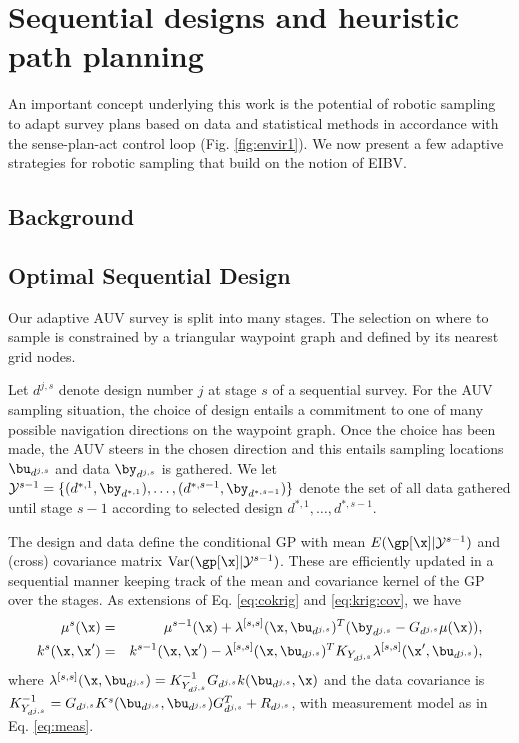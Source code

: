 \section{Sequential designs and heuristic path planning}\label{sec:heuristics}

An important concept underlying this work is the potential of robotic
sampling to adapt survey plans based on data and statistical methods
in accordance with the sense-plan-act control loop
(Fig. \ref{fig:envir1}). We now present a few adaptive strategies for
robotic sampling that build on the notion of EIBV.

\subsection{Background}


\subsection{Optimal Sequential Design}
\label{Optdes}

Our adaptive AUV survey is split into many stages. The selection on
where to sample is constrained by a triangular waypoint graph and
defined by its nearest grid nodes.

Let $d^{j,s}$ denote design number $j$ at stage $s$ of a sequential
survey. For the AUV sampling situation, the choice of design entails a commitment to one of many possible navigation directions on the waypoint graph. Once the choice has been made, the AUV steers in the chosen direction and this entails sampling locations $\bu_{d^{j,s}}$ and data $\by_{d^{j,s}}$ is gathered.  We let
$\mathcal{Y}^{s-1} =\{(d^{*,1}, \by_{d^{*,1}}),\ldots, (d^{*,s-1},
\by_{d^{*,s-1}}) \}$ denote the set of all data gathered until stage
$s-1$ according to selected design $d^{*,1},\ldots,d^{*,s-1}$.  

The design and data define
the conditional GP with mean
$E(\gp[\x]|\mathcal{Y}^{s-1})$ and (cross) covariance matrix
$\mbox{Var}(\gp[\x]|\mathcal{Y}^{s-1})$. These are efficiently updated in a sequential manner keeping track of the mean and covariance kernel of the GP over the stages. As extensions of Eq. \eqref{eq:cokrig} and \eqref{eq:krig:cov}, we have
\begin{eqnarray}\label{eq:krigSUR}
\mu^{s}(\x) &=&\mu^{s-1}(\x)+\lambda^{[s,s]}(\x,\bu_{d^{j,s}})^T (\by_{d^{j,s}}-G_{d^{j,s}} \mu(\x)), \nonumber \\
k^{s}(\x,\x') &=& k^{s-1}(\x,\x')-\lambda^{[s,s]}(\x,\bu_{d^{j,s}})^T K_{Y_{d^{j,s}}} \lambda^{[s,s]}(\x',\bu_{d^{j,s}}),
\end{eqnarray}
where $\lambda^{[s,s]}(\x,\bu_{d^{j,s}})=K^{-1}_{Y_{d^{j,s}}} G_{d^{j,s}} k(\bu_{d^{j,s}},\x)$ and the data covariance is $K^{-1}_{Y_{d^{j,s}}}=G_{d^{j,s}} K^s(\bu_{d^{j,s}},\bu_{d^{j,s}})G^T_{d^{j,s}}+R_{d^{j,s}}$, with measurement model as in Eq. \eqref{eq:meas}.

